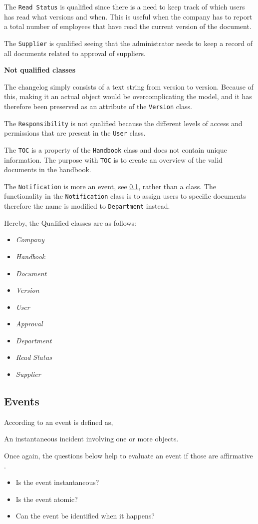 The \texttt{Read Status} is qualified since there is a need to keep track of which users has read what versions and when.
This is useful when the company has to report a total number of employees that have read the current version of the document.

The \texttt{Supplier} is qualified seeing that the administrator needs to keep a record of all documents related to approval of suppliers.

\textbf{Not qualified classes}

The changelog simply consists of a text string from version to version.
Because of this, making it an actual object would be overcomplicating the model, and it has therefore been preserved as an attribute of the \texttt{Version} class.

The \texttt{Responsibility} is not qualified because the different levels of access and permissions that are present in the \texttt{User} class.

The \texttt{TOC} is a property of the \texttt{Handbook} class and does not contain unique information.
The purpose with \texttt{TOC} is to create an overview of the valid documents in the handbook.

The \texttt{Notification} is more an event, see \cref{sec:Events}, rather than a class.
The functionality in the \texttt{Notification} class is to assign users to specific documents therefore the name is modified to \texttt{Department} instead.

Hereby, the Qualified classes are as follows:
\begin{multicols}{4}
	\begin{itemize}
	\item \textit{Company}
	\item \textit{Handbook}
	\item \textit{Document}
	\item \textit{Version}
	\item \textit{User}
	\item \textit{Approval}
	\item \textit{Department}
	\item \textit{Read Status}
	\item \textit{Supplier}
	\end{itemize}
\end{multicols}

\subsection{Events} \label{sec:Events}
According to \citep[p.~53]{Rod-Aalborg} an event is defined as,
\begin{defn}\label{defn:Event}
An instantaneous incident involving one or more objects.
\end{defn}
Once again, the questions below help to evaluate an event if those are affirmative \citep[p.~65]{Rod-Aalborg}.
\begin{itemize}
	\item Is the event instantaneous?
	\item Is the event atomic?
	\item Can the event be identified when it happens?
\end{itemize}

